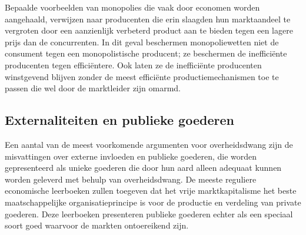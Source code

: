 Bepaalde voorbeelden van monopolies die vaak door economen worden aangehaald, verwijzen naar producenten die erin slaagden hun marktaandeel te vergroten door een aanzienlijk verbeterd product aan te bieden tegen een lagere prijs dan de concurrenten. In dit geval beschermen monopoliewetten niet de consument tegen een monopolistische producent; ze beschermen de inefficiënte producenten tegen efficiëntere. Ook laten ze de inefficiënte producenten winstgevend blijven zonder de meest efficiënte productiemechanismen toe te passen die wel door de marktleider zijn omarmd.

\subsection{Externaliteiten en publieke goederen}

Een aantal van de meest voorkomende argumenten voor overheidsdwang zijn de misvattingen over \textquotesingle externe invloeden\textquotesingle{} en \textquotesingle publieke goederen\textquotesingle, die worden gepresenteerd als unieke goederen die door hun aard alleen adequaat kunnen worden geleverd met behulp van overheidsdwang. De meeste reguliere economische leerboeken zullen toegeven dat het vrije marktkapitalisme het beste maatschappelijke organisatieprincipe is voor de productie en verdeling van private goederen. Deze leerboeken presenteren \textquotesingle publieke goederen\textquotesingle{} echter als een speciaal soort goed waarvoor de markten ontoereikend zijn.

